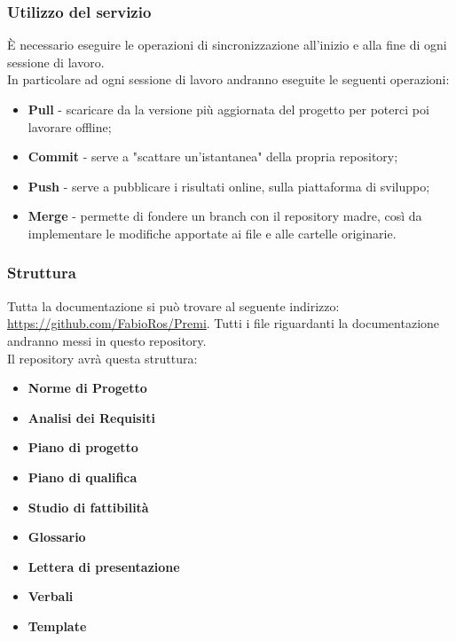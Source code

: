 		\subsubsection{Utilizzo del servizio}
È necessario eseguire le operazioni di sincronizzazione all'inizio e alla fine di ogni sessione di lavoro. \\
In particolare ad ogni sessione di lavoro andranno eseguite le seguenti operazioni:
\begin{itemize}
	\item \textbf{Pull} - scaricare da la versione più aggiornata del progetto per poterci poi lavorare offline;
	\item \textbf{Commit} - serve a "scattare un'istantanea" della propria repository;
	\item \textbf{Push} - serve a pubblicare i risultati online, sulla piattaforma di sviluppo;
	\item \textbf{Merge} - permette di fondere un branch con il repository madre, così da implementare le modifiche apportate ai file e alle cartelle originarie.
\end{itemize}

		\subsubsection{Struttura}
Tutta la documentazione si può trovare al seguente indirizzo: \url{https://github.com/FabioRos/Premi}. Tutti i file riguardanti la documentazione andranno messi in questo repository. \\
Il repository avrà questa struttura:
\begin{itemize}
	\item \textbf{Norme di Progetto}
	\item \textbf{Analisi dei Requisiti}
	\item \textbf{Piano di progetto}
	\item \textbf{Piano di qualifica}
	\item \textbf{Studio di fattibilità}
	\item \textbf{Glossario}
	\item \textbf{Lettera di presentazione}
	\item \textbf{Verbali}
	\item \textbf{Template}
\end{itemize}


